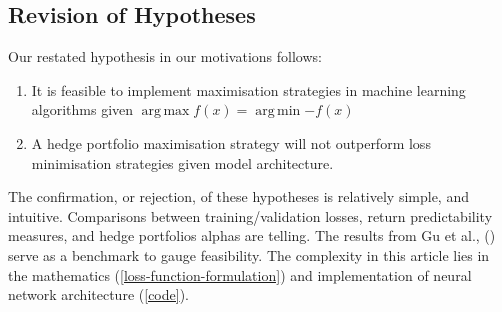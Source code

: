 \documentclass[12pt]{article}
\DeclareMathOperator*{\argmax}{arg\,max}
\DeclareMathOperator*{\argmin}{arg\,min} %
\begin{document}
\subsection{Revision of Hypotheses}
Our restated hypothesis in our motivations follows:
\singlespacing
\begin{enumerate}
	\item It is feasible to implement maximisation strategies in machine learning algorithms given $\argmax{f(x)}=\argmin{-f(x)}$
	\item A hedge portfolio maximisation strategy will not outperform loss minimisation strategies given model architecture.
\end{enumerate}
\doublespacing
The confirmation, or rejection, of these hypotheses is relatively simple, and intuitive.
Comparisons between training/validation losses, return predictability measures, and hedge portfolios alphas are telling.
The results from Gu et al., (\citeyear{eapvml}) serve as a benchmark to gauge feasibility.
The complexity in this article lies in the mathematics (\ref{loss-function-formulation}) and implementation of neural network architecture (\ref{code}).
\newpage
\end{document}
